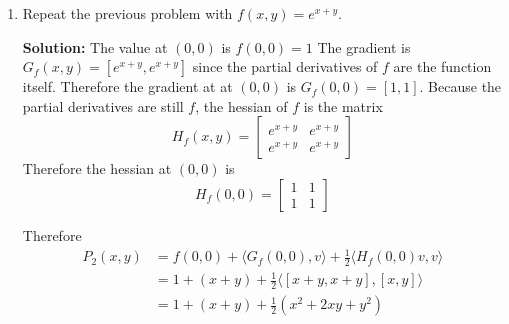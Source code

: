 \documentclass{report}
\newcommand{\solution}{\textbf{Solution: }}
\newcommand{\inner}[2]{\langle #1, #2 \rangle}
\newcommand{\pdiv}[1]{\frac{\partial}{\partial #1}}
\begin{document}
\begin{enumerate}
	\solution 
	The value at $(0, 0)$ is $f(0, 0) = 0$
	The gradient is $G_f(x, y) = [\frac{y}{1+xy}, \frac{x}{1+xy}]$
	from taking the partial derivatives. 
	The gradient at $(0, 0)$ is thus $G_f(0, 0) = [0, 0]$.
	The Hessian is the matrix of the partial derivatives of the partial derivatives.
	\begin{align*}
		H_f(x, y) 
		= 	\begin{bmatrix}
				\pdiv{x}\pdiv{x} f & \pdiv{x}\pdiv{y} f \\
				\pdiv{y}\pdiv{x} f & \pdiv{y}\pdiv{y} f
			\end{bmatrix} \\
		= 	\begin{bmatrix}
				\pdiv{x}\frac{y}{1+xy} & \pdiv{x}\frac{x}{1+xy} \\
				\pdiv{y}\frac{y}{1+xy} f & \pdiv{y}\frac{x}{1+xy}
			\end{bmatrix} \\
		= 	\begin{bmatrix}
			-\frac{y^2}{(1+xy)^2} & \frac{1}{(1+xy)^2} \\
			\frac{1}{(1+xy)^2} & -\frac{x^2}{(1+xy)^2}
		\end{bmatrix} \\
	\end{align*}
	Therefore,
	\[
		H_f(0, 0) =
		\begin{bmatrix}
			0 & 1 \\
			1 & 0
		\end{bmatrix}
	\]

	Therefore, 
	\begin{align*}
		P_2(x, y) 
		&= f(0, 0) + \inner{G_f(0, 0)}{v} + \frac{1}{2}\inner{H_f(0, 0)v}{v} \\
		&= 0 + 0 + \frac{1}{2}\inner{[y, x]}{[x, y]} \\
		&= xy
	\end{align*}
	\medskip
	\item
	Repeat the previous problem with $f(x,y) = e^{x+y}$.

	\solution
	The value at $(0,0)$ is $f(0,0) = 1$
	The gradient is $G_f(x, y) = [e^{x+y}, e^{x+y}]$ 
	since the partial derivatives of $f$ are the function itself. 
	Therefore the gradient at at $(0,0)$ is $G_f(0, 0) = [1, 1]$.
	Because the partial derivatives are still $f$,
	the hessian of $f$ is the matrix 
	\[
	H_f(x, y) =
	\begin{bmatrix}
		e^{x+y} & e^{x+y} \\
		e^{x+y} & e^{x+y}
	\end{bmatrix}
	\]
	Therefore the hessian at $(0, 0)$ is
	\[
	H_f(0, 0) =
	\begin{bmatrix}
		1 & 1 \\
		1 & 1
	\end{bmatrix}
	\]

	Therefore 
	\begin{align*}
		P_2(x, y) 
		&= f(0, 0) + \inner{G_f(0, 0)}{v} + \frac{1}{2}\inner{H_f(0, 0)v}{v} \\
		&= 1 + (x + y) + \frac{1}{2}\inner{[x+y, x+y]}{[x, y]} \\
		&= 1 + (x + y) + \frac{1}{2}(x^2+2xy+y^2)
	\end{align*}
	\end{enumerate}
	
\end{document}
